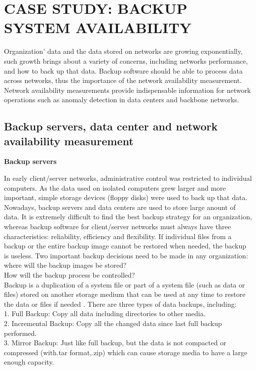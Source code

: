 \documentclass[english]{tktltiki2}
\theoremstyle{definition}
\theoremstyle{remark}
\begin{document}
\pagebreak
\section{CASE STUDY: BACKUP SYSTEM AVAILABILITY}
Organization’ data and the data stored on networks are growing exponentially, such growth brings about a variety of concerns, including networks performance, and how to back up that data. Backup software should be able to process data across networks, thus the importance of the 
network availability measurement.
Network availability measurements provide indispensable information for network operations such as  anomaly detection in data centers and backbone networks. 
\subsection{Backup servers, data center and network availability measurement} \label{Backup}

\begin{flushleft}
\textbf{Backup servers}
\end{flushleft}
In early client/server networks, administrative control was restricted to individual computers. As the data used on isolated computers grew larger and more important, simple storage devices (floppy disks) were used to back up that data. Nowadays, backup servers and data centers are used to store large
anount of data.
It is extremely difficult to find the best backup strategy for an organization, whereas backup software for client/server networks must always have three characteristics: reliability, efficiency and flexibility.  
If individual files from a backup or the entire backup image cannot be restored when needed, the backup is useless. 
Two important backup decisions need to be made in any organization:\\ 
where will the backup images be stored?\\
How will the backup process be controlled?\\
Backup is a duplication of a system file or part of a system file (such as data or files) stored on another storage medium that can be used at any time to restore the data or files if needed \cite{6765952}. There are three types of data backups, including:\\ 
    1. Full Backup: Copy all data including directories to other media.\\
    2. Incremental Backup: Copy all the changed data since last full backup performed.\\
    3. Mirror Backup: Just like full backup, but the data is not compacted or compressed (with.tar format,.zip) which can cause storage media to have a large enough capacity.
\end{document}
